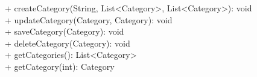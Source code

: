 {
    + createCategory(String, List<Category>, List<Category>): void \\
    + updateCategory(Category, Category): void \\
    + saveCategory(Category): void \\
    + deleteCategory(Category): void \\
    + getCategories(): List<Category> \\
    + getCategory(int): Category
}{}